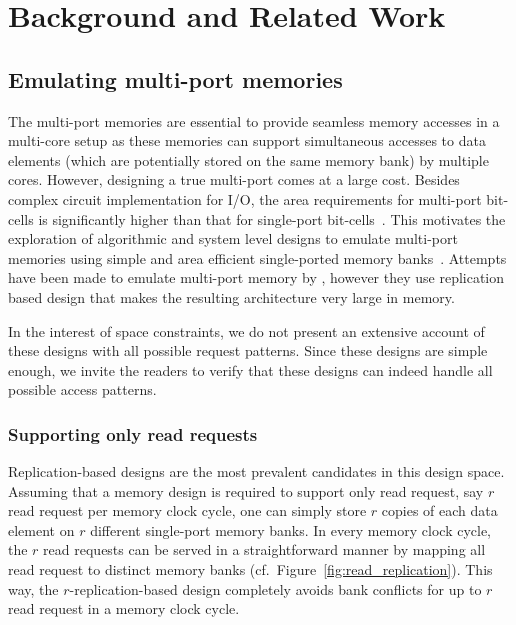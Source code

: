 \section{Background and Related Work}
\label{sec:bg}

\subsection{Emulating multi-port memories}
\label{sec:emulation}

The multi-port memories are essential to provide seamless memory accesses in a multi-core setup as these memories can support simultaneous accesses to data elements (which are potentially stored on the same memory bank) by multiple cores. However, designing a true multi-port comes at a large cost. Besides complex circuit implementation for I/O, the area requirements for multi-port bit-cells is significantly higher than that for single-port bit-cells~\cite{Suzuki,WLCH14}. This motivates the exploration of algorithmic and system level designs to emulate multi-port memories using simple and area efficient single-ported memory banks~\cite{ACP88, EMY91, RG91,Memoir_xor, Memoir_xor_virtual}. Attempts have been made to emulate multi-port memory by \cite{CCES93}, however they use replication based design that makes the resulting architecture very large in memory. \par


In the interest of space constraints, we do not present an extensive account of these designs with all possible request patterns. Since these designs are simple enough, we invite the readers to verify that these designs can indeed handle all possible access patterns.

\subsubsection{Supporting only read requests} 
\label{sec:read_only}
Replication-based designs are the most prevalent candidates in this design space. Assuming that a memory design is required to support only read request, say $r$ read request per memory clock cycle, one can simply store $r$ copies of each data element on $r$ different single-port memory banks. In every memory clock cycle, the $r$ read requests can be served in a straightforward manner by mapping all read request to distinct memory banks (cf.~Figure~\ref{fig:read_replication}). This way, the $r$-replication-based design completely avoids bank conflicts for up to $r$ read request in a memory clock cycle. 

